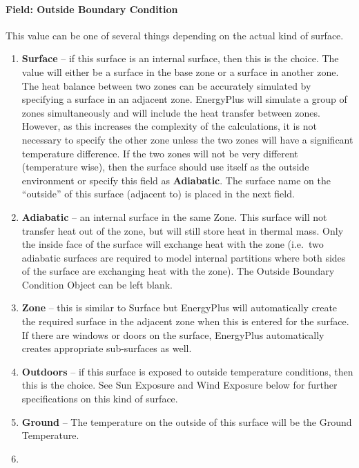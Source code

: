 \paragraph{Field: Outside Boundary Condition}\label{field-outside-boundary-condition-1}

This value can be one of several things depending on the actual kind of surface.

\begin{enumerate}
  \item
    \textbf{Surface} -- if this surface is an internal surface, then this is the choice. The value will either be a surface in the base zone or a surface in another zone. The heat balance between two zones can be accurately simulated by specifying a surface in an adjacent zone. EnergyPlus will simulate a group of zones simultaneously and will include the heat transfer between zones. However, as this increases the complexity of the calculations, it is not necessary to specify the other zone unless the two zones will have a significant temperature difference. If the two zones will not be very different (temperature wise), then the surface should use itself as the outside environment or specify this field as \textbf{Adiabatic}. The surface name on the ``outside'' of this surface (adjacent to) is placed in the next field.
  \item
    \textbf{Adiabatic} -- an internal surface in the same Zone. This surface will not transfer heat out of the zone, but will still store heat in thermal mass. Only the inside face of the surface will exchange heat with the zone (i.e.~two adiabatic surfaces are required to model internal partitions where both sides of the surface are exchanging heat with the zone). The Outside Boundary Condition Object can be left blank.
  \item
    \textbf{Zone} -- this is similar to Surface but EnergyPlus will automatically create the required surface in the adjacent zone when this is entered for the surface. If there are windows or doors on the surface, EnergyPlus automatically creates appropriate sub-surfaces as well.
  \item
    \textbf{Outdoors} -- if this surface is exposed to outside temperature conditions, then this is the choice. See Sun Exposure and Wind Exposure below for further specifications on this kind of surface.
  \item
    \textbf{Ground} -- The temperature on the outside of this surface will be the Ground Temperature.
  \item

\end{enumerate}
